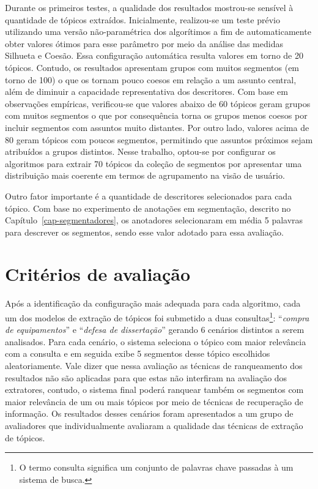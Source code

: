 Durante os primeiros testes, a qualidade dos resultados mostrou-se sensível à quantidade de tópicos extraídos.
Inicialmente, realizou-se um teste prévio utilizando uma versão não-paramétrica dos algorítimos a fim de automaticamente obter valores ótimos para esse parâmetro por meio da análise das medidas Silhueta e Coesão. Essa configuração automática resulta valores em torno de 20 tópicos. Contudo, os resultados apresentam grupos com muitos segmentos (em torno de 100) o que os tornam pouco coesos em relação a um assunto central, além de diminuir a capacidade representativa dos descritores.
Com base em observações empíricas, verificou-se que valores abaixo de 60 tópicos geram grupos com muitos segmentos o que por consequência torna os grupos menos coesos por incluir segmentos com assuntos muito distantes. Por outro lado, valores acima de 80 geram tópicos com poucos segmentos, permitindo que assuntos próximos sejam atribuídos a grupos distintos. Nesse trabalho, optou-se por configurar os algoritmos para extrair 70 tópicos da coleção de segmentos por apresentar uma distribuição mais coerente em termos de agrupamento na visão de usuário.

Outro fator importante é a quantidade de descritores selecionados para cada tópico. Com base no experimento de anotações em segmentação, descrito no Capítulo~\ref{cap-segmentadores}, os anotadores selecionaram em média 5 palavras para descrever os segmentos, sendo esse valor adotado para essa avaliação.




\section{Critérios de avaliação}

Após a identificação da configuração mais adequada para cada algoritmo, cada um dos modelos de extração de tópicos foi submetido a duas consultas\footnote{O termo consulta significa um conjunto de palavras chave passadas à um sistema de busca.}: ``\textit{compra de equipamentos}'' e ``\textit{defesa de dissertação}'' gerando 6 cenários distintos a serem analisados. 
Para cada cenário, o sistema seleciona o tópico com maior relevância com a consulta e em seguida exibe 5 segmentos desse tópico escolhidos aleatoriamente. 
Vale dizer que nessa avaliação as técnicas de ranqueamento dos resultados não são aplicadas para que estas não interfiram na avaliação dos extratores, contudo, o sistema final poderá ranquear também os segmentos com maior relevância de um ou mais tópicos por meio de técnicas de recuperação de informação. 
Os resultados desses cenários foram apresentados a um grupo de avaliadores que individualmente avaliaram a qualidade das técnicas de extração de tópicos. 
%

